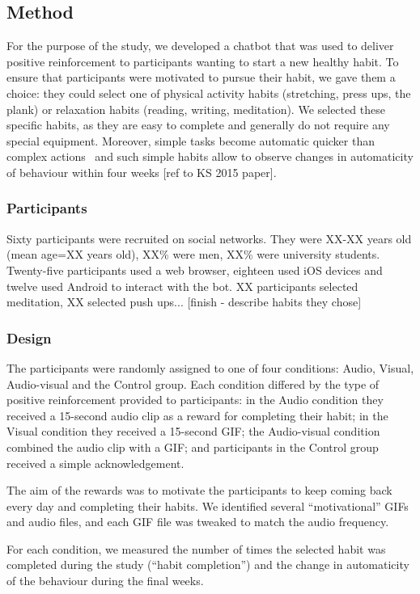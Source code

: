 \documentclass{scaffold/sigchi}
\begin{document}
\subsection{Method}
For the purpose of the study, we developed a chatbot that was used to deliver positive reinforcement to participants wanting to start a new healthy habit. To ensure that participants were motivated to pursue their habit, we gave them a choice: they could select one of physical activity habits (stretching, press ups, the plank) or relaxation habits (reading, writing, meditation). We selected these specific habits, as they are easy to complete and generally do not require any special equipment. Moreover, simple tasks become automatic quicker than complex actions~\cite{article_how_habits_formed_modelling_habit_formation} and such simple habits allow to observe changes in automaticity of behaviour within four weeks [ref to KS 2015 paper].

\subsubsection{Participants}
Sixty participants were recruited on social networks. They were XX-XX years old (mean age=XX years old), XX\% were men, XX\% were university students. Twenty-five participants used a web browser, eighteen used iOS devices and twelve used Android to interact with the bot. XX participants selected meditation, XX selected push ups... [finish - describe habits they chose]

\subsubsection{Design}
The participants were randomly assigned to one of four conditions: Audio, Visual, Audio-visual and the Control group. Each condition differed by the type of positive reinforcement provided to participants: in the Audio condition they received a 15-second audio clip as a reward for completing their habit; in the Visual condition they received a 15-second GIF; the Audio-visual condition combined the audio clip with a GIF; and participants in the Control group received a simple acknowledgement. 

The aim of the rewards was to motivate the participants to keep coming back every day and completing their habits. We identified several ``motivational'' GIFs and audio files, and each GIF file was tweaked to match the audio frequency.


For each condition, we measured the number of times the selected habit was completed during the study (``habit completion'') and the change in automaticity of the behaviour during the final weeks. 
\end{document}
